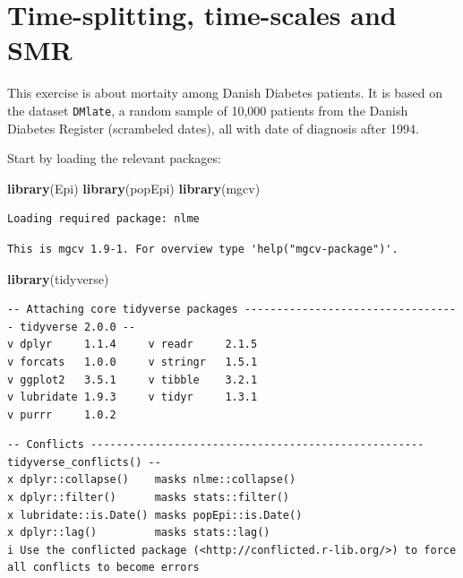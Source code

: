 \documentclass[
]{book}
\newenvironment{Shaded}{\begin{snugshade}}{\end{snugshade}}
\newcommand{\FunctionTok}[1]{\textcolor[rgb]{0.13,0.29,0.53}{\textbf{#1}}}
\newcommand{\NormalTok}[1]{#1}
\begin{document}
\chapter{Time-splitting, time-scales and SMR}\label{time-splitting-time-scales-and-smr}

This exercise is about mortaity among Danish Diabetes patients. It is
based on the dataset \texttt{DMlate}, a random sample of 10,000
patients from the Danish Diabetes Register (scrambeled dates), all
with date of diagnosis after 1994.

Start by loading the relevant packages:

\begin{Shaded}
\begin{Highlighting}[]
\FunctionTok{library}\NormalTok{(Epi)}
\FunctionTok{library}\NormalTok{(popEpi)}
\FunctionTok{library}\NormalTok{(mgcv)}
\end{Highlighting}
\end{Shaded}

\begin{verbatim}
Loading required package: nlme
\end{verbatim}

\begin{verbatim}
This is mgcv 1.9-1. For overview type 'help("mgcv-package")'.
\end{verbatim}

\begin{Shaded}
\begin{Highlighting}[]
\FunctionTok{library}\NormalTok{(tidyverse)}
\end{Highlighting}
\end{Shaded}

\begin{verbatim}
-- Attaching core tidyverse packages ---------------------------------- tidyverse 2.0.0 --
v dplyr     1.1.4     v readr     2.1.5
v forcats   1.0.0     v stringr   1.5.1
v ggplot2   3.5.1     v tibble    3.2.1
v lubridate 1.9.3     v tidyr     1.3.1
v purrr     1.0.2     
\end{verbatim}

\begin{verbatim}
-- Conflicts ---------------------------------------------------- tidyverse_conflicts() --
x dplyr::collapse()    masks nlme::collapse()
x dplyr::filter()      masks stats::filter()
x lubridate::is.Date() masks popEpi::is.Date()
x dplyr::lag()         masks stats::lag()
i Use the conflicted package (<http://conflicted.r-lib.org/>) to force all conflicts to become errors
\end{verbatim}
\end{document}
